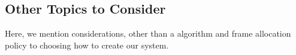 \subsection{Other Topics to Consider}\label{subsec:Other_Topics_to_Consider}
Here, we mention considerations, other than a  algorithm and frame allocation policy to choosing how to create our  system.


